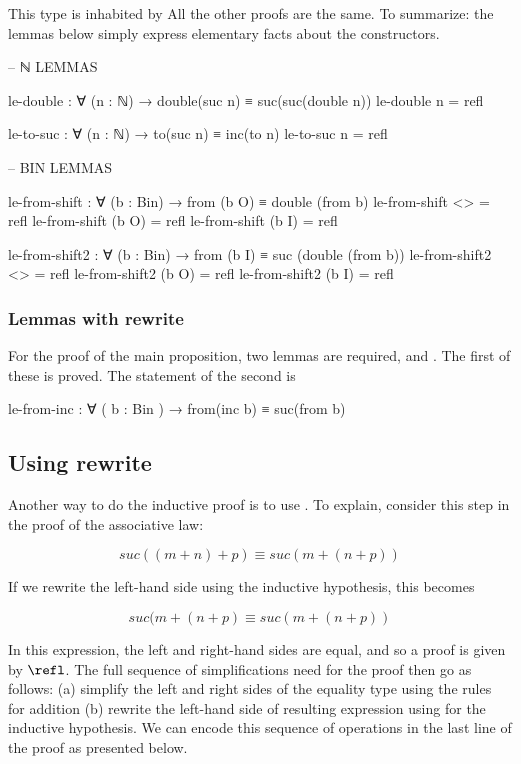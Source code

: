This type is inhabited by   All the other proofs are the same.  To summarize: the lemmas below simply express elementary facts about the constructors.

\begin{colored}[elm]
-- ℕ LEMMAS

le-double : ∀ (n : ℕ) → double(suc n) ≡ suc(suc(double n))
le-double n = refl

le-to-suc : ∀ (n : ℕ) → to(suc n) ≡ inc(to n)
le-to-suc n = refl

-- BIN LEMMAS

le-from-shift : ∀ (b : Bin) → from (b O) ≡ double (from b)
le-from-shift <> = refl
le-from-shift (b O) = refl
le-from-shift (b I) = refl

le-from-shift2 : ∀ (b : Bin) → from (b I) ≡ suc (double (from b))
le-from-shift2 <> = refl
le-from-shift2 (b O) = refl
le-from-shift2 (b I) = refl
\end{colored}


\subsubsection{Lemmas with rewrite}

For the proof of the main proposition, two lemmas are required,  and . The first of these is proved.  The statement of the second is

\begin{colored}[elm]
le-from-inc : ∀ ( b : Bin ) → from(inc b) ≡ suc(from b)
\end{colored}

\subsection{Using rewrite}


Another way to do the inductive proof is to use .  To explain, consider this step in the proof of the associative law:

$$
 suc ((m + n) + p) \equiv suc (m + (n + p))
$$

 If we rewrite the left-hand side using the inductive hypothesis, this becomes

\begin{equation}
suc (m + (n + p) \equiv suc (m + (n + p))
\end{equation}

In this expression, the left and right-hand sides are equal, and so a proof is given by $\refl$. 
The full sequence of simplifications need for the proof then go as follows: (a) simplify the left and right sides of the equality type using the rules for addition (b) rewrite the left-hand side of resulting expression using  for the inductive hypothesis. We can encode this sequence of operations in the last line of the proof as presented below.  

